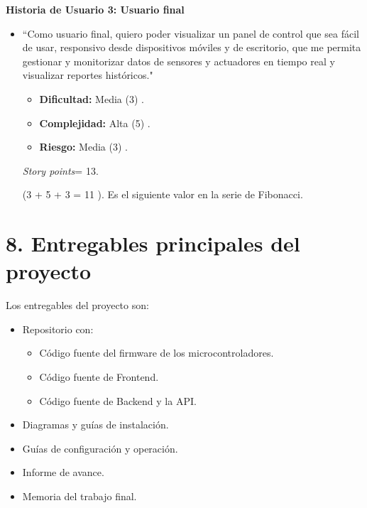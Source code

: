 \documentclass[
11pt, %
codirector, %
]{charter}
\begin{document}
\textbf{Historia de Usuario 3: Usuario final}
\begin{itemize}
	\item ``Como usuario final, quiero poder visualizar un panel de control que sea fácil de usar, responsivo desde dispositivos móviles y de escritorio,
	      que me permita gestionar y monitorizar datos de sensores y actuadores en tiempo real y visualizar reportes históricos."

	      \begin{itemize}
		      \item \textbf{Dificultad:} Media (3) .
		      \item \textbf{Complejidad:} Alta (5) .
		      \item \textbf{Riesgo:} Media (3) .
	      \end{itemize}

	      \textit{Story points}= 13.

	      (3 + 5 + 3 = 11 ). Es el siguiente valor en la serie de Fibonacci.

\end{itemize}

\section{8. Entregables principales del proyecto}
\label{sec:entregables}

Los entregables del proyecto son:
\begin{itemize}
	\item Repositorio con:
	      \begin{itemize}
		      \item Código fuente del firmware de los microcontroladores.
		      \item Código fuente de Frontend.
		      \item Código fuente de Backend y la API.
	      \end{itemize}
	\item Diagramas y guías de instalación.
	\item Guías de configuración y operación.
	\item Informe de avance.
	\item Memoria del trabajo final.
\end{itemize}
\end{document}
